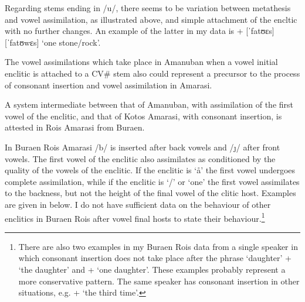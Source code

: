 Regarding stems ending in /u/, there seems to be variation
between metathesis and vowel assimilation, as illustrated
above, and simple attachment of the encltic with no further changes.
An example of the latter in my data
is  +  {\ra}  [ˈfatʊɛs]{\tl}[ˈfatʊwɛs] `one stone/rock'.

The vowel assimilations which take place in Amanuban
when a vowel initial enclitic is attached to a CV{\#}
stem also could represent a precursor to the process
of consonant insertion and vowel assimilation in Amarasi.

A system intermediate between that of Amanuban,
with assimilation of the first vowel of the enclitic,
and that of Kotos Amarasi, with consonant insertion,
is attested in Ro{\Q}is Amarasi from Buraen.

In Buraen Ro{\Q}is Amarasi /b/ is inserted after back vowels
and /\j/ after front vowels.
The first vowel of the enclitic also assimilates
as conditioned by the quality of the vowels of the enclitic.
If the enclitic is  `{\aa}' the first vowel undergoes
complete assimilation, while if the enclitic is  {\ii}
 `{\ee}/{\eeV}' or  `one' the first vowel
assimilates to the backness, but not the height of the final vowel of the clitic host.
Examples are given in  below.
I do not have sufficient data on the behaviour of other
enclitics in Buraen Ro{\Q}is after vowel final hosts to state their behaviour.\footnote{
		There are also two examples in my Buraen Ro{\Q}is data from a single speaker
		in which consonant insertion does not take place
		after the phrase  `daughter' + 
		{\ra}  `the daughter' and + 
		{\ra}  `one daughter'.
		These examples probably represent a more conservative pattern.
		The same speaker has consonant insertion in other situations,
		e.g.  +  {\ra}  `the third time'.}

